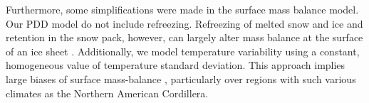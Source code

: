 Furthermore, some simplifications were made in the surface mass balance model. Our PDD model do not include refreezing. Refreezing of melted snow and ice and retention in the snow pack, however, can largely alter mass balance at the surface of an ice sheet \citep{janssens-huybrechts-2000}. Additionally, we model temperature variability using a constant, homogeneous value of temperature standard deviation. This approach implies large biases of surface mass-balance \citep{charbit-etal-2013,rau-rogozhina-2013,seguinot-inreview}, particularly over regions with such various climates as the Northern American Cordillera.

